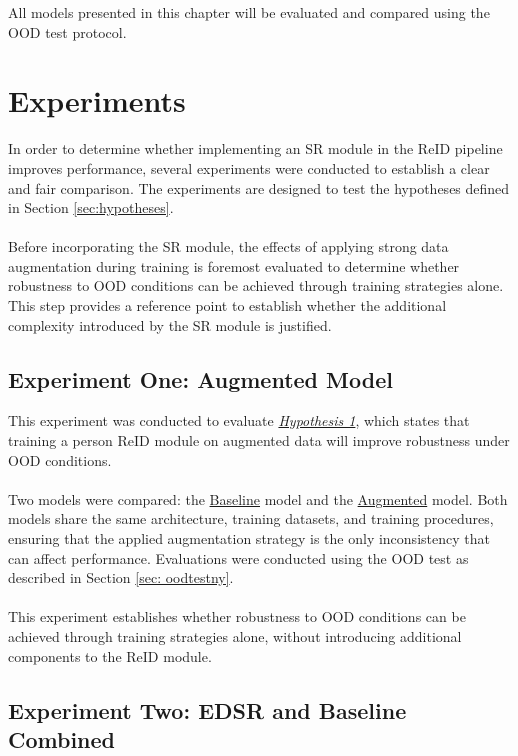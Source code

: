 \noindent All models presented in this chapter will be evaluated and compared using the \acs{OOD} test protocol.


\section{Experiments} \label{sec: experimentsdefined}

In order to determine whether implementing an \acs{SR} module in the \acs{ReID} pipeline improves performance, several experiments were conducted to establish a clear and fair comparison. The experiments are designed to test the hypotheses defined in Section \ref{sec:hypotheses}. 
\\\\
Before incorporating the \acs{SR} module, the effects of applying strong data augmentation during training is foremost evaluated to determine whether robustness to \acs{OOD} conditions can be achieved through training strategies alone. This step provides a reference point to establish whether the additional complexity introduced by the \acs{SR} module is justified. 

\subsection{Experiment One: Augmented Model} \label{sec: baselineosnet}

This experiment was conducted to evaluate \hyperlink{hypothesis:1}{\textit{Hypothesis 1}}, which states that training a person \acs{ReID} module on augmented data will improve robustness under \acs{OOD} conditions.  
\\\\
Two models were compared: the \hyperlink{model:baseline}{Baseline} model and the \hyperlink{model:augmented}{Augmented} model. Both models share the same architecture, training datasets, and training procedures, ensuring that the applied augmentation strategy is the only inconsistency that can affect performance. Evaluations were conducted using the \acs{OOD} test as described in Section \ref{sec: oodtestny}. 
\\\\
This experiment establishes whether robustness to \acs{OOD} conditions can be achieved through training strategies alone, without introducing additional components to the \acs{ReID} module. 
 

\subsection{Experiment Two: \acs{EDSR} and Baseline Combined} \label{sec: sr+baseline}

